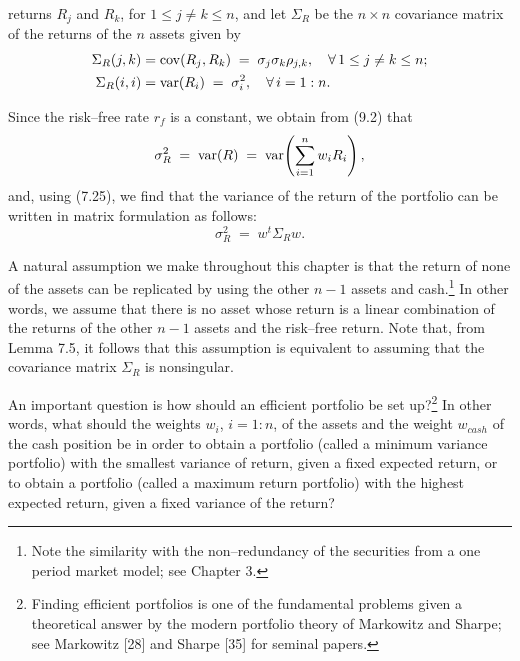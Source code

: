 
returns $R_j$ and $R_k$, for $1 \le j \ne k \le n$, and let $\Sigma_R$ be the $n \times
n$ covariance matrix of the returns of the $n$ assets given by
\begin{align*}
\Sigma_R(j,k) &= \operatorname{cov}(R_j,R_k) \;=\; \sigma_j\sigma_k\rho_{j,k}, \quad \forall\, 1\le
j\ne k\le n; \\
\Sigma_R(i,i) &= \operatorname{var}(R_i) \;=\; \sigma_i^2, \quad \forall\, i = 1:n.
\end{align*}

Since the risk--free rate $r_f$ is a constant, we obtain from (9.2) that
\[
\sigma_R^2 \;=\; \operatorname{var}(R) \;=\; \operatorname{var}\!\left(\sum_{i=1}^n w_iR_i\right),
\]
and, using (7.25), we find that the variance of the return of the portfolio can be
written in matrix formulation as follows:
\begin{equation}
\sigma_R^2 \;=\; w^t\Sigma_Rw.
\end{equation}

A natural assumption we make throughout this chapter is that the return of none of the
assets can be replicated by using the other $n-1$ assets and cash.\footnote{Note the
similarity with the non--redundancy of the securities from a one period market model;
see Chapter 3.} In other words, we assume that there is no asset whose return is a
linear combination of the returns of the other $n-1$ assets and the risk--free return.
Note that, from Lemma 7.5, it follows that this assumption is equivalent to assuming
that the covariance matrix $\Sigma_R$ is nonsingular.

An important question is how should an efficient portfolio be set up?\footnote{Finding
efficient portfolios is one of the fundamental problems given a theoretical answer by
the modern portfolio theory of Markowitz and Sharpe; see Markowitz [28] and Sharpe [35]
for seminal papers.} In other words, what should the weights $w_i$, $i = 1:n$, of the
assets and the weight $w_{cash}$ of the cash position be in order to obtain a portfolio
(called a minimum variance portfolio) with the smallest variance of return, given a
fixed expected return, or to obtain a portfolio (called a maximum return portfolio)
with the highest expected return, given a fixed variance of the return?

